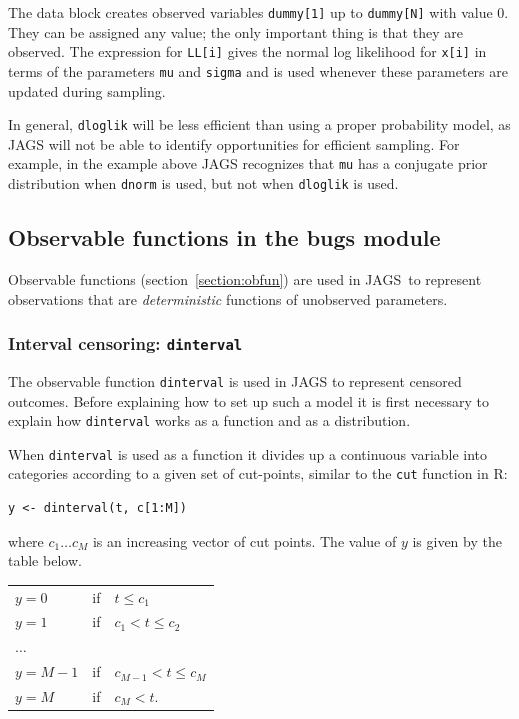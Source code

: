 \documentclass[11pt, a4paper, titlepage]{report}
\newcommand{\JAGS}{\textsf{JAGS}}
\newcommand{\R}{\textsf{R}}
\begin{document}
{The data block creates observed variables \texttt{dummy[1]} up to
\texttt{dummy[N]} with value 0. They can be assigned any value; the
only important thing is that they are observed. The expression for
\texttt{LL[i]} gives the normal log likelihood for \texttt{x[i]} in
terms of the parameters \texttt{mu} and \texttt{sigma} and is used
whenever these parameters are updated during sampling.

In general, \texttt{dloglik} will be less efficient than using a
proper probability model, as JAGS will not be able to identify
opportunities for efficient sampling. For example, in the example
above JAGS recognizes that \texttt{mu} has a conjugate prior
distribution when \texttt{dnorm} is used, but not when
\texttt{dloglik} is used.

\subsection{Observable functions in the bugs module}
\label{section:bugs:obfun}

Observable functions (section~\ref{section:obfun}) are used in
\JAGS\ to represent observations that are {\em deterministic}
functions of unobserved parameters.

\subsubsection{Interval censoring: \texttt{dinterval}}
\label{bugs:dinterval}

The observable function \texttt{dinterval} is used in JAGS to
represent censored outcomes. Before explaining how to set up such a
model it is first necessary to explain how \texttt{dinterval} works as
a function and as a distribution.

When \texttt{dinterval} is used as a function it divides up a
continuous variable into categories according to a given set of
cut-points, similar to the \texttt{cut} function in \R:
\begin{verbatim}
y <- dinterval(t, c[1:M])
\end{verbatim}
where $c_1 \ldots c_M$ is an increasing vector of cut points. The value
of $y$ is given by the table below.

\begin{center}
\begin{tabular}{lll}
  \hline
  $y = 0$   & if & $t \leq c_1$\\
  $y = 1$   & if & $c_1 < t \leq c_2$ \\
  $\ldots$  & \\
  $y = M-1$   & if & $c_{M-1} < t \leq c_M$ \\
  $y = M$   & if & $c_M < t$. \\
  \hline
\end{tabular}
\end{center}

}
\end{document}
